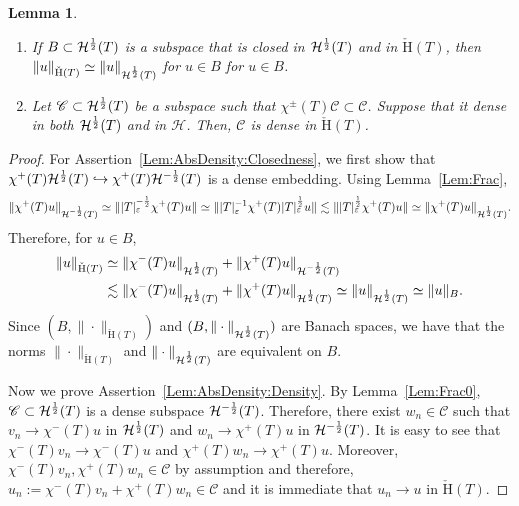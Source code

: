\documentclass[a4paper,10pt,reqno]{amsart}
\newcommand{\modulus}[1]{|#1|}
\newcommand{\norm}[1]{\| #1 \|}%
\newcommand{\OpSobH}[2][{}]{{\mathcal{H}}^{#2}_{\rm #1}}
\newcommand{\checkH}{\check{\mathrm{H}}}
\newcommand{\Hil}{\mathscr{H}}
\newcommand{\core}{\mathscr{C}}
\newcommand{\embed}{\hookrightarrow}%
\renewcommand{\epsilon}{\varepsilon}
\newtheorem{lemma}[theorem]{Lemma}
\theoremstyle{definition}
\begin{document}
\begin{lemma}
\label{Lem:AbsDensity}
\begin{enumerate}[label=(\roman*), labelwidth=0pt, labelindent=2pt, leftmargin=21pt]
\item \label{Lem:AbsDensity:Closedness}
      If $B \subset \OpSobH{\frac12}(T)$ is a subspace that is closed in $\OpSobH{\frac12}(T)$ and in $\checkH(T)$, then $\norm{u}_{\checkH(T)} \simeq \norm{u}_{\OpSobH{\frac12}(T)}$ for $u\in B$ for $u\in B$.
\item \label{Lem:AbsDensity:Density}
      Let $\core \subset \OpSobH{\frac12}(T)$ be a subspace such that $\chi^{\pm}(T) \core \subset \core$.
      Suppose that it dense  in both $\OpSobH{\frac12}(T)$ and in $\Hil$.
      Then, $\core$ is dense in $\checkH(T)$.
\end{enumerate}
\end{lemma}
\begin{proof}
For Assertion~\ref{Lem:AbsDensity:Closedness}, we first show that $\chi^+(T)\OpSobH{\frac12}(T) \embed \chi^+(T)\OpSobH{-\frac12}(T)$ is a dense embedding.
Using Lemma~\ref{Lem:Frac},
$$ \norm{\chi^+(T) u}_{\OpSobH{-\frac12}(T)}
\simeq \norm{ \modulus{T}_{\epsilon}^{-\frac12} \chi^+(T) u}
\simeq \norm{\modulus{T}_{\epsilon}^{-1} \chi^+(T) \modulus{T}_{\epsilon}^{\frac12} u}
\lesssim \norm{\modulus{T}_{\epsilon}^{\frac12} \chi^+(T) u}
\simeq \norm{\chi^+(T)u}_{\OpSobH{\frac12}(T)}.$$
Therefore, for $u \in B$,
\begin{align*}
\norm{u}_{\checkH(T)}
 & \simeq \norm{\chi^-(T)u}_{\OpSobH{\frac12}(T)} + \norm{\chi^+(T)u}_{\OpSobH{-\frac12}(T)}  \\
 & \lesssim \norm{\chi^-(T)u}_{\OpSobH{\frac12}(T)} + \norm{\chi^+(T)u}_{\OpSobH{\frac12}(T)}
\simeq \norm{u}_{\OpSobH{\frac12}(T)}
\simeq \norm{u}_{B}.
\end{align*}
Since $(B, \norm{\cdot}_{\checkH(T)})$ and $(B, \norm{\cdot}_{\OpSobH{\frac12}(T)})$ are Banach spaces, we have that the norms $\norm{\cdot}_{\checkH(T)}$ and $\norm{\cdot}_{\OpSobH{\frac12}(T)}$ are equivalent on $B$.

Now we prove Assertion~\ref{Lem:AbsDensity:Density}.
By Lemma~\ref{Lem:Frac0}, $\core \subset  \OpSobH{\frac12}(T)$   is a dense subspace $\OpSobH{-\frac12}(T)$.
Therefore, there exist $w_n \in \core$ such that $v_n \to \chi^-(T)u$ in $\OpSobH{\frac12}(T)$ and $w_n \to \chi^+(T)u$ in $\OpSobH{-\frac12}(T)$.
It is easy to see that $\chi^-(T)v_n \to \chi^-(T)u$ and $\chi^+(T)w_n \to \chi^+(T)u$.
Moreover, $\chi^-(T)v_n, \chi^+(T)w_n \in \core$ by assumption and therefore, $u_n := \chi^-(T)v_n + \chi^+(T)w_n \in \core$ and it is immediate that $u_n \to u$ in $\checkH(T)$.
\end{proof}
\end{document}
